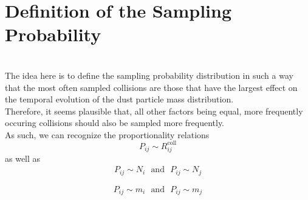 



\section{Definition of the Sampling Probability}

     \\

    The idea here is to define the sampling probability distribution in such a way that the most 
    often sampled collisions are those that have the largest effect on the temporal evolution of 
    the dust particle mass distribution. \\

    Therefore, it seems plausible that, all other factors being equal, more frequently occuring 
    collisions should also be sampled more frequently. \\

    As such, we can recognize the proportionality relations
    \begin{equation}
        P_{ij} \sim R^\text{coll}_{ij}
    \end{equation}
    as well as 
    \begin{align}
        P_{ij} \sim N_i 
        \ \ \ \text{and} \ \ \
        P_{ij} \sim N_j
    \end{align}

    \begin{equation}
        P_{ij} \sim m_i
        \ \ \ \text{and} \ \ \
        P_{ij} \sim m_j
    \end{equation}

